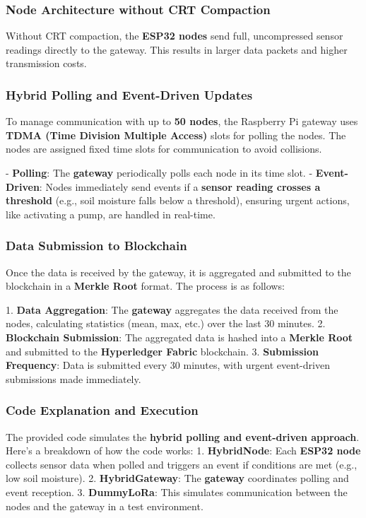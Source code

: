 \documentclass[12pt,onecolumn]{IEEEtran} %
\begin{document}
\subsubsection{Node Architecture without CRT Compaction}

Without CRT compaction, the \textbf{ESP32 nodes} send full, uncompressed sensor readings directly to the gateway. This results in larger data packets and higher transmission costs.

\subsubsection{Hybrid Polling and Event-Driven Updates}

To manage communication with up to \textbf{50 nodes}, the Raspberry Pi gateway uses \textbf{TDMA (Time Division Multiple Access)} slots for polling the nodes. The nodes are assigned fixed time slots for communication to avoid collisions.

- \textbf{Polling}: The \textbf{gateway} periodically polls each node in its time slot.
- \textbf{Event-Driven}: Nodes immediately send events if a \textbf{sensor reading crosses a threshold} (e.g., soil moisture falls below a threshold), ensuring urgent actions, like activating a pump, are handled in real-time.

\subsubsection{Data Submission to Blockchain}

Once the data is received by the gateway, it is aggregated and submitted to the blockchain in a \textbf{Merkle Root} format. The process is as follows:

1. \textbf{Data Aggregation}: The \textbf{gateway} aggregates the data received from the nodes, calculating statistics (mean, max, etc.) over the last 30 minutes.
2. \textbf{Blockchain Submission}: The aggregated data is hashed into a \textbf{Merkle Root} and submitted to the \textbf{Hyperledger Fabric} blockchain.
3. \textbf{Submission Frequency}: Data is submitted every 30 minutes, with urgent event-driven submissions made immediately.

\subsubsection{Code Explanation and Execution}

The provided code simulates the \textbf{hybrid polling and event-driven approach}. Here’s a breakdown of how the code works:
1. \textbf{HybridNode}: Each \textbf{ESP32 node} collects sensor data when polled and triggers an event if conditions are met (e.g., low soil moisture).
2. \textbf{HybridGateway}: The \textbf{gateway} coordinates polling and event reception.
3. \textbf{DummyLoRa}: This simulates communication between the nodes and the gateway in a test environment.
\end{document}
